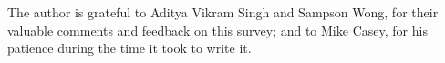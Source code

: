 \documentclass[biber]{nowfnt} %
\begin{document}
%

\begin{acknowledgements}
The author is grateful to Aditya Vikram Singh and Sampson Wong, for their valuable comments and feedback on this survey; and to Mike Casey, for his patience during the time it took to write it.
\end{acknowledgements}
\end{document}
